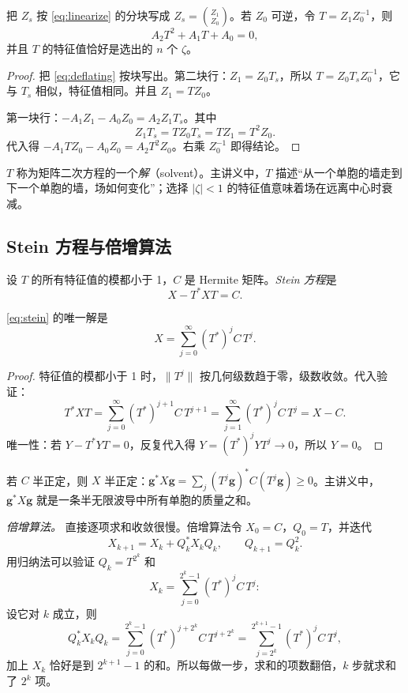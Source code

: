 \documentclass[11pt,a4paper,fontset=fandol]{ctexart}
\begin{document}
\begin{proposition}
\label{prop:matrix-quadratic}
把 $Z_s$ 按 \eqref{eq:linearize} 的分块写成 $Z_s=\binom{Z_1}{Z_0}$。若 $Z_0$ 可逆，令 $T=Z_1Z_0^{-1}$，则
\[
A_2T^2+A_1T+A_0=0 ,
\]
并且 $T$ 的特征值恰好是选出的 $n$ 个 $\zeta$。
\end{proposition}

\begin{proof}
把 \eqref{eq:deflating} 按块写出。第二块行：$Z_1=Z_0T_s$，所以 $T=Z_0T_sZ_0^{-1}$，它与 $T_s$ 相似，特征值相同。并且 $Z_1=TZ_0$。

第一块行：$-A_1Z_1-A_0Z_0=A_2Z_1T_s$。其中
\[
Z_1T_s=TZ_0T_s=TZ_1=T^2Z_0 .
\]
代入得 $-A_1TZ_0-A_0Z_0=A_2T^2Z_0$。右乘 $Z_0^{-1}$ 即得结论。
\end{proof}

$T$ 称为矩阵二次方程的一个\emph{解}（solvent）。主讲义中，$T$ 描述“从一个单胞的墙走到下一个单胞的墙，场如何变化”；选择 $|\zeta|<1$ 的特征值意味着场在远离中心时衰减。

\subsection{Stein 方程与倍增算法}
\label{sec:stein}

设 $T$ 的所有特征值的模都小于 1，$C$ 是 Hermite 矩阵。\emph{Stein 方程}是
\begin{equation}
\label{eq:stein}
X-T^*XT=C .
\end{equation}

\begin{proposition}
\label{prop:stein}
\eqref{eq:stein} 的唯一解是
\[
X=\sum_{j=0}^\infty(T^*)^jC\,T^j .
\]
\end{proposition}

\begin{proof}
特征值的模都小于 1 时，$\|T^j\|$ 按几何级数趋于零，级数收敛。代入验证：
\[
T^*XT=\sum_{j=0}^\infty(T^*)^{j+1}C\,T^{j+1}=\sum_{j=1}^\infty(T^*)^jC\,T^j=X-C .
\]
唯一性：若 $Y-T^*YT=0$，反复代入得 $Y=(T^*)^jYT^j\to0$，所以 $Y=0$。
\end{proof}

若 $C$ 半正定，则 $X$ 半正定：$\bm g^*X\bm g=\sum_j(T^j\bm g)^*C(T^j\bm g)\ge0$。主讲义中，$\bm g^*X\bm g$ 就是一条半无限波导中所有单胞的质量之和。

\emph{倍增算法。} 直接逐项求和收敛很慢。倍增算法令 $X_0=C$，$Q_0=T$，并迭代
\[
X_{k+1}=X_k+Q_k^*X_kQ_k,\qquad Q_{k+1}=Q_k^2 .
\]
用归纳法可以验证 $Q_k=T^{2^k}$ 和
\[
X_k=\sum_{j=0}^{2^k-1}(T^*)^jC\,T^j :
\]
设它对 $k$ 成立，则
\[
Q_k^*X_kQ_k=\sum_{j=0}^{2^k-1}(T^*)^{j+2^k}C\,T^{j+2^k}=\sum_{j=2^k}^{2^{k+1}-1}(T^*)^jC\,T^j ,
\]
加上 $X_k$ 恰好是到 $2^{k+1}-1$ 的和。所以每做一步，求和的项数翻倍，$k$ 步就求和了 $2^k$ 项。
\end{document}

